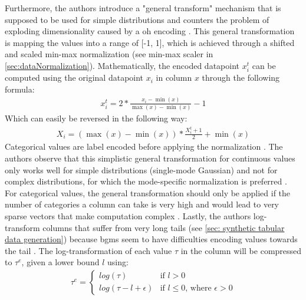 Furthermore, the authors introduce a "general transform" mechanism \cite[p. 7]{zhao2022CTABGANEnhancingTabular} that is supposed to be used for simple distributions and counters the problem of exploding dimensionality caused by a \gls{oh} encoding \cite{zhao2022CTABGANEnhancingTabular}.
This general transformation is mapping the values into a range of [-1, 1], which is achieved through a shifted and scaled min-max normalization (see min-max scaler in \autoref{sec:dataNormalization}).
Mathematically, the encoded datapoint $x^t_i$ can be computed using the original datapoint $x_i$ in column $x$ through the following formula:
\begin{equation}
	\begin{align*}
		x^t_i=2* \frac{x_i-\min(x)}{\max(x)-\min(x)}-1
	\end{align*}
\end{equation}
Which can easily be reversed in the following way:
\begin{equation}
	\begin{align*}
		X_i = (\max(x)-\min(x))*\frac{X^t_i+1}{2}+\min(x)
	\end{align*}
\end{equation}
Categorical values are label encoded before applying the normalization \cite{zhao2022CTABGANEnhancingTabular}.
The authors observe that this simplistic general transformation for continuous values only works well for simple distributions (\eg single-mode Gaussian) and not for complex distributions, for which the mode-specific normalization is preferred \cite{zhao2022CTABGANEnhancingTabular}.
For categorical values, the general transformation should only be applied if the number of categories a column can take is very high and would lead to very sparse vectors that make computation complex \cite{zhao2022CTABGANEnhancingTabular}.
Lastly, the authors log-transform columns that suffer from very long tails (see \autoref{sec: synthetic tabular data generation}) because \Glspl{bgm} seem to have difficulties encoding values towards the tail \cite{zhao2022CTABGANEnhancingTabular}.
The log-transformation of each value $\tau$ in the column will be compressed to $\tau^e$, given a lower bound $l$ using:
\begin{equation}
	\label{eqn:log-transform}
	\begin{align*}
		\tau^e =
		\begin{cases}
			log(\tau)            & \text{if } l>0                                 \\
			log(\tau-l+\epsilon) & \text{if } l\leq0 \text{, where } \epsilon > 0
		\end{cases}
	\end{align*}
\end{equation}

